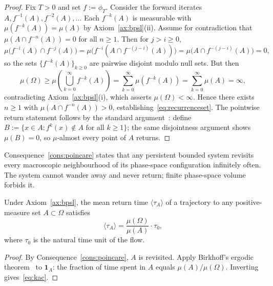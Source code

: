 \begin{proof}
Fix $T>0$ and set $f:=\phi_{T}$.
Consider the forward iterates $A, f^{-1}(A), f^{-2}(A),\ldots$
Each $f^{-k}(A)$ is measurable with $\mu(f^{-k}(A))=\mu(A)$ by
Axiom~\ref{ax:bpsl}(ii).
Assume for contradiction that $\mu(A\cap f^{-n}(A))=0$ for all $n\ge 1$.
Then for $j>i\ge 0$,
\begin{equation*}
  \mu\bigl(f^{-i}(A)\cap f^{-j}(A)\bigr)
    = \mu\bigl(f^{-i}(A\cap f^{-(j-i)}(A))\bigr)
    = \mu\bigl(A\cap f^{-(j-i)}(A)\bigr)=0,
\end{equation*}
so the sets $\{f^{-k}(A)\}_{k\ge 0}$ are pairwise disjoint modulo
null sets.
But then
\begin{equation*}
  \mu(\Omega)
  \ge \mu\!\left(\bigcup_{k=0}^{\infty}f^{-k}(A)\right)
  = \sum_{k=0}^{\infty}\mu(f^{-k}(A))
  = \sum_{k=0}^{\infty}\mu(A)=\infty,
\end{equation*}
contradicting Axiom~\ref{ax:bpsl}(i), which asserts $\mu(\Omega)<\infty$.
Hence there exists $n\ge 1$ with $\mu(A\cap f^{-n}(A))>0$,
establishing~\eqref{eq:recurrenceset}.
The pointwise return statement follows by the standard
argument~\citep{walters1982}: define
$B:=\{x\in A : f^{k}(x)\notin A\text{ for all }k\ge 1\}$;
the same disjointness argument shows $\mu(B)=0$, so $\mu$-almost every
point of $A$ returns.
\end{proof}

\begin{remark}
Consequence~\ref{cons:poincare} states that any persistent bounded system
revisits every macroscopic neighbourhood of its phase-space configuration
infinitely often.
The system cannot wander away and never return; finite phase-space volume
forbids it.
\end{remark}

\begin{corollary}
\label{cor:kac}
Under Axiom~\ref{ax:bpsl}, the mean return time $\langle\tau_{A}\rangle$
of a trajectory to any positive-measure set $A\subset\Omega$ satisfies
\begin{equation}
  \langle\tau_{A}\rangle = \frac{\mu(\Omega)}{\mu(A)}\cdot\tau_{0},
  \label{eq:kac}
\end{equation}
where $\tau_{0}$ is the natural time unit of the flow.
\end{corollary}

\begin{proof}
By Consequence~\ref{cons:poincare}, $A$ is revisited.
Apply Birkhoff's ergodic theorem~\citep{birkhoff1931} to
$\mathbf{1}_{A}$: the fraction of time spent in $A$ equals
$\mu(A)/\mu(\Omega)$.
Inverting gives~\eqref{eq:kac}.
\end{proof}

